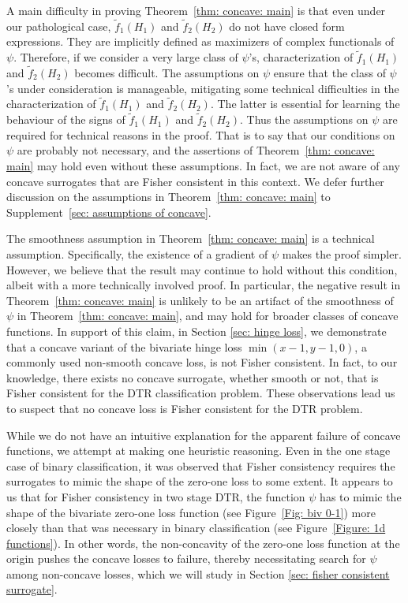 \documentclass[preprint] {imsart}
\begin{document}
\begin{remark}
 A main difficulty in proving Theorem~\ref{thm: concave: main} is that even under our pathological case, $\tilde f_1(H_1)$ and $\tilde f_2(H_2)$ do not have closed form expressions. They are implicitly defined as maximizers of complex functionals of $\psi$. Therefore, if we consider a very large class of $\psi$'s,  characterization of $\tilde f_1(H_1)$ and $\tilde f_2(H_2)$ becomes difficult.
The assumptions on $\psi$ ensure that the class of $\psi$'s under consideration is manageable, mitigating some technical difficulties in the 
characterization of $\tilde f_1(H_1)$ and $\tilde f_2(H_2)$. The latter is essential for learning the behaviour of the signs of $\tilde f_1(H_1)$ and $\tilde f_2(H_2)$. Thus the assumptions  on $\psi$ are required for  technical reasons in the proof. That is to say that our conditions on $\psi$ are probably not necessary, and the assertions of Theorem~\ref{thm: concave: main} may hold even without these assumptions. In fact, we are not aware of any concave surrogates that are Fisher consistent in this context. We defer further discussion on the  assumptions in Theorem~\ref{thm: concave: main} to Supplement~\ref{sec: assumptions of concave}. \hfill\qedsymbol
  \end{remark}

{\color{black} \label{page: smoothness assumption}The smoothness assumption in Theorem~\ref{thm: concave: main} is a technical assumption. Specifically, the existence of a gradient of $\psi$ makes the proof simpler. However, we believe that the result may continue to hold without this condition, albeit with a more technically involved proof. In particular,  the negative result  in Theorem~\ref{thm: concave: main} is unlikely to be an artifact of the smoothness of $\psi$ in Theorem~\ref{thm: concave: main}, and may hold for broader classes of concave functions. In support of this claim, in Section  \ref{sec: hinge loss}, we demonstrate  that a concave variant of the bivariate hinge loss $\min(x-1, y-1, 0)$, a commonly used non-smooth concave loss, is not Fisher consistent. In fact, to our knowledge, there exists no concave surrogate, whether smooth or not, that is Fisher consistent for the DTR classification problem. These observations lead us to suspect that no concave loss is Fisher consistent for the DTR problem.} 

While we do not have an intuitive explanation for the apparent failure of  concave functions, 
 we attempt at making one heuristic reasoning. Even in the one stage case of binary classification, it was observed that  Fisher consistency requires the surrogates to mimic the shape of the zero-one loss to some extent.
It appears to us that for Fisher consistency in two stage DTR, the function $\psi$ has to mimic the shape of the bivariate zero-one loss function (see Figure~\ref{Fig: biv 0-1}) more closely than that was necessary in  binary classification (see Figure~\ref{Figure: 1d functions}). In other words, the non-concavity of the zero-one loss function at the origin  pushes the concave losses to failure, thereby necessitating search for $\psi$ among non-concave losses, which we will study in Section \ref{sec: fisher consistent surrogate}.
\end{document}
